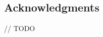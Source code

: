 \documentclass{sig-alternate}
\begin{document}
	\subsection{Acknowledgments}
	// TODO




\end{document}
